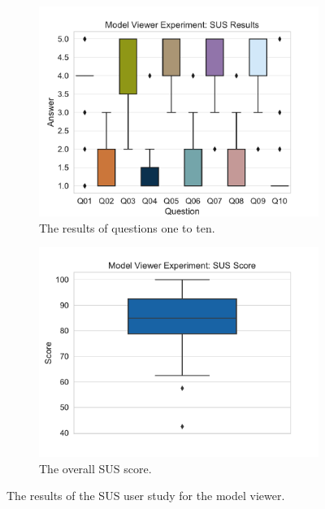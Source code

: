 \begin{figure}[H]
	\centering
	\begin{subfigure}[t]{.48\linewidth}%
		\centering
		\includegraphics[width=\linewidth]{figures/evaluation/res_exp_mv.pdf}
		\caption{The results of questions one to ten.}\label{fig:res-exp-mv}
	\end{subfigure}%
	\hspace{0.03\linewidth}%
	\begin{subfigure}[t]{.48\linewidth}%
		\centering
		\includegraphics[width=\linewidth]{figures/evaluation/score_exp_mv.pdf}
		\caption{The overall \gls{SUS} score.}\label{fig:score-exp-mv}
	\end{subfigure}%
	\caption[Model viewer SUS results]{The results of the \gls{SUS} user study for the model viewer.}\label{fig:exp-mv-stats}
\end{figure}

